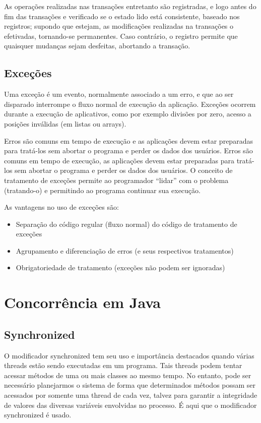 As operações realizadas nas transações entretanto são registradas, e logo antes do fim das 
transações e verificado se o estado lido está consistente, baseado nos registros; supondo 
que estejam, as modificações realizadas na transações o efetivadas, tornando-se permanentes. 
Caso contrário, o registro permite que quaisquer mudanças sejam desfeitas, abortando a transação.


\section{Exceções}

Uma exceção é um evento, normalmente associado a um erro, e que ao ser disparado interrompe o 
fluxo normal de execução da aplicação. Exceções ocorrem durante a execução de aplicativos, como 
por exemplo divisões por zero, acesso a posições inválidas (em listas ou arrays).


Erros são comuns em tempo de execução e as aplicações devem estar preparadas para tratá-los 
sem abortar o programa e perder os dados dos usuários. Erros são comuns em tempo de execução, 
as aplicações devem estar preparadas para tratá-los sem abortar o programa e perder os dados 
dos usuários. O conceito de tratamento de exceções permite ao programador ``lidar'' com o 
problema (tratando-o) e permitindo ao programa continuar sua execução.

As vantagens no uso de exceções são: 

\begin{itemize}
\item Separação do código regular (fluxo normal) do código de tratamento de exceções
\item Agrupamento e diferenciação de erros (e seus respectivos tratamentos)
\item Obrigatoriedade de tratamento (exceções não podem ser ignoradas)
\end{itemize}

\chapter{Concorrência em Java}

\section{Synchronized}

O modificador synchronized tem seu uso e importância destacados quando várias threads estão sendo executadas em um programa. Tais threads podem tentar acessar métodos de uma ou mais classes ao mesmo tempo. No entanto, pode ser necessário planejarmos o sistema de forma que determinados métodos possam ser acessados por somente uma thread de cada vez, talvez para garantir a integridade de valores das diversas variáveis envolvidas no processo. É aqui que o modificador synchronized é usado.

